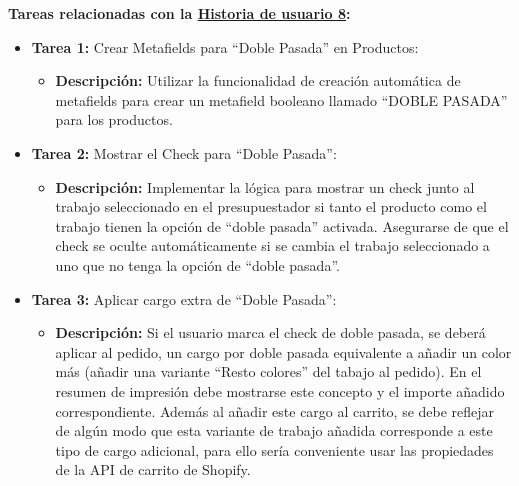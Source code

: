 \documentclass[12pt]{article}
\begin{document}
\textbf{Tareas relacionadas con la \hyperref[sec:historia8]{Historia de usuario 8}:}
\begin{itemize}
    \item \textbf{Tarea 1:} Crear Metafields para ``Doble Pasada'' en Productos:
          \begin{itemize}[label=--]
              \item \textbf{Descripción:} Utilizar la funcionalidad de creación automática de metafields para crear un metafield booleano llamado ``DOBLE PASADA'' para los productos.
          \end{itemize}
    \item \textbf{Tarea 2:} Mostrar el Check para ``Doble Pasada'':
          \begin{itemize}[label=--]
              \item \textbf{Descripción:} Implementar la lógica para mostrar un check junto al trabajo seleccionado en el presupuestador si tanto el producto como el trabajo tienen la opción de ``doble pasada'' activada. Asegurarse de que el check se oculte automáticamente si se cambia el trabajo seleccionado a uno que no tenga la opción de ``doble pasada''.
          \end{itemize}
    \item \textbf{Tarea 3:} Aplicar cargo extra de ``Doble Pasada'':
          \begin{itemize}[label=--]
              \item \textbf{Descripción:} Si el usuario marca el check de doble pasada, se deberá aplicar al pedido, un cargo por doble pasada equivalente a añadir un color más (añadir una variante ``Resto colores'' del tabajo al pedido). En el resumen de impresión debe mostrarse este concepto y el importe añadido correspondiente. Además al añadir este cargo al carrito, se debe reflejar de algún modo que esta variante de trabajo añadida corresponde a este tipo de cargo adicional, para ello sería conveniente usar las propiedades de la API de carrito de Shopify.
          \end{itemize}
\end{itemize}
\end{document}
